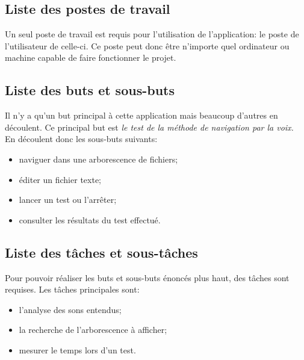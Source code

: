 \documentclass[a4paper, 11pt]{report}
\begin{document}
			\subsection{Liste des postes de travail}
			
			Un seul poste de travail est requis pour l'utilisation de l'application: le poste de l'utilisateur de celle-ci. Ce poste peut donc \^etre n'importe quel ordinateur ou machine capable de faire fonctionner le projet.
			
			\subsection{Liste des buts et sous-buts}
			
			Il n'y a qu'un but principal à cette application mais beaucoup d'autres en découlent. Ce principal but est \emph{le test de la méthode de navigation par la voix.}\\
			En découlent donc les sous-buts suivants:
			\begin{itemize}
				\item naviguer dans une arborescence de fichiers;
				\item éditer un fichier texte;
				\item lancer un test ou l'arr\^eter;
				\item consulter les résultats du test effectué.
			\end{itemize}
			
			\subsection{Liste des t\^aches et sous-t\^aches}
			
			Pour pouvoir réaliser les buts et sous-buts énoncés plus haut, des tâches sont requises. Les tâches principales sont:
			\begin{itemize}
				\item l'analyse des sons entendus;
				\item la recherche de l'arborescence à afficher;
				\item mesurer le temps lors d'un test.
			\end{itemize}
			
\end{document}
